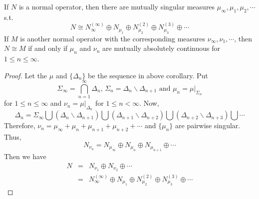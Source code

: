 \begin{thm}
	If $N$ is a normal operator, then there are mutually singular measures $\mu_{\infty}, \mu_1, \mu_2, \cdots$ s.t.
	\begin{equation*}
		N \cong N_{\infty}^{(\infty)} \oplus N_{\mu_1} \oplus N_{\mu_2}^{(2)} \oplus  N_{\mu_3}^{(3)} \oplus \cdots
	\end{equation*}
	If $M$ is another normal operator with the corresponding  measures $\nu_{\infty}, \nu_1, \cdots$, then $N \cong M$ if and only if $\mu_n$ and $\nu_n$ are mutually absolutely continuous for $1 \leqslant n \leqslant \infty$.
\end{thm}
\begin{proof}
	Let the $\mu$ and $\{\Delta_n\}$ be the sequence in above corollary. Put
	\begin{equation*}
		\Sigma_{\infty} = \bigcap_{n=1}^{\infty} \Delta_n \text{, } \Sigma_n = \Delta_n \backslash \Delta_{n+1} \text{ and } \mu_n = \mu|_{\Sigma_n}
	\end{equation*}
	for $1 \leqslant n \leqslant \infty$ and $\nu_n = \mu|_{\Delta_n}$ for $1 \leqslant n < \infty$. Now, 
	\begin{equation*}
		\Delta_n = \Sigma_{\infty} \bigcup (\Delta_n \backslash \Delta_{n+1}) \bigcup (\Delta_{n+1} \backslash \Delta_{n+2}) \bigcup (\Delta_{n+2} \backslash \Delta_{n+3}) \bigcup \cdots
	\end{equation*}
	Therefore, $\nu_n = \mu_{\infty} + \mu_n + \mu_{n+1} + \mu_{n+2} + \cdots$ and $\{\mu_n\}$ are pairwise singular.
	Thus,
	\begin{equation*}
		N_{\nu_n} = N_{\mu_{\infty}} \oplus N_{\mu_n} \oplus N_{\mu_{n+1}} \oplus \cdots
	\end{equation*}
	Then we have
	\begin{eqnarray*}
		N &=& N_{\nu_1} \oplus N_{\nu_2} \oplus \cdots \\
		&=& N_{\infty}^{(\infty)} \oplus N_{\mu_1} \oplus N_{\mu_2}^{(2)} \oplus  N_{\mu_3}^{(3)} \oplus \cdots
	\end{eqnarray*}
\end{proof}











